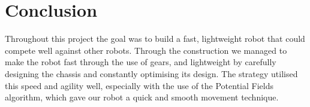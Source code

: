 \section{Conclusion}

Throughout this project the goal was to build a fast, lightweight robot that could compete well against other robots. Through the construction we managed to make the robot fast through the use of gears, and lightweight by carefully designing the chassis and constantly optimising its design. The strategy utilised this speed and agility well, especially with the use of the Potential Fields algorithm, which gave our robot a quick and smooth movement technique.